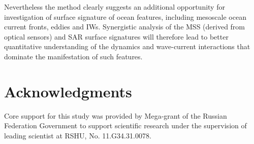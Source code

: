 \documentclass{report}
\begin{document}
Nevertheless the method clearly suggests an additional opportunity for investigation of surface signature of ocean features, including mesoscale ocean current fronts, eddies and IWs. Synergistic analysis of the MSS (derived from optical sensors) and SAR surface signatures will therefore lead to better quantitative understanding of the dynamics and wave-current interactions that dominate the manifestation of such features.


\section{Acknowledgments}

Core support for this study was provided by Mega-grant of the Russian Federation Government to support scientific research under the supervision of leading scientist at RSHU, No. 11.G34.31.0078.



\end{document}
